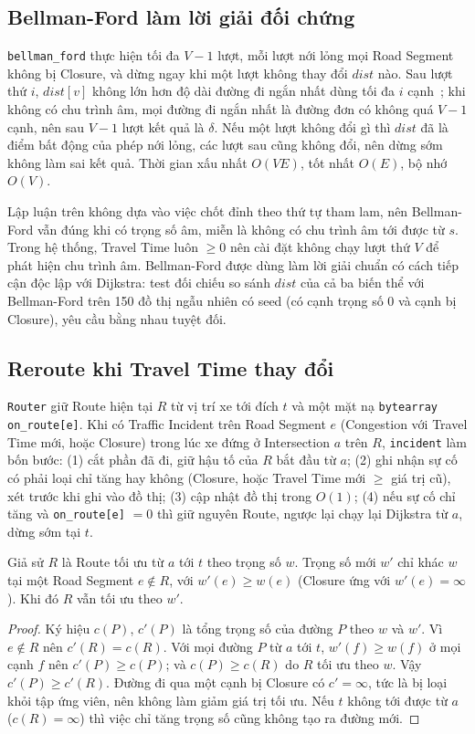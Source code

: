 \subsection{Bellman-Ford làm lời giải đối chứng}

\texttt{bellman\_ford} thực hiện tối đa $V-1$ lượt, mỗi lượt nới lỏng mọi Road Segment không bị Closure, và dừng ngay khi một lượt không thay đổi $\mathit{dist}$ nào. Sau lượt thứ $i$, $\mathit{dist}[v]$ không lớn hơn độ dài đường đi ngắn nhất dùng tối đa $i$ cạnh~\cite{clrs2022}; khi không có chu trình âm, mọi đường đi ngắn nhất là đường đơn có không quá $V-1$ cạnh, nên sau $V-1$ lượt kết quả là $\delta$. Nếu một lượt không đổi gì thì $\mathit{dist}$ đã là điểm bất động của phép nới lỏng, các lượt sau cũng không đổi, nên dừng sớm không làm sai kết quả. Thời gian xấu nhất $O(VE)$, tốt nhất $O(E)$, bộ nhớ $O(V)$.

Lập luận trên không dựa vào việc chốt đỉnh theo thứ tự tham lam, nên Bellman-Ford vẫn đúng khi có trọng số âm, miễn là không có chu trình âm tới được từ $s$. Trong hệ thống, Travel Time luôn $\ge 0$ nên cài đặt không chạy lượt thứ $V$ để phát hiện chu trình âm. Bellman-Ford được dùng làm lời giải chuẩn có cách tiếp cận độc lập với Dijkstra: test đối chiếu so sánh $\mathit{dist}$ của cả ba biến thể với Bellman-Ford trên 150 đồ thị ngẫu nhiên có seed (có cạnh trọng số 0 và cạnh bị Closure), yêu cầu bằng nhau tuyệt đối.

\subsection{Reroute khi Travel Time thay đổi}

\texttt{Router} giữ Route hiện tại $R$ từ vị trí xe tới đích $t$ và một mặt nạ \texttt{bytearray} \texttt{on\_route[e]}. Khi có Traffic Incident trên Road Segment $e$ (Congestion với Travel Time mới, hoặc Closure) trong lúc xe đứng ở Intersection $a$ trên $R$, \texttt{incident} làm bốn bước: (1) cắt phần đã đi, giữ hậu tố của $R$ bắt đầu từ $a$; (2) ghi nhận sự cố có phải loại chỉ tăng hay không (Closure, hoặc Travel Time mới $\ge$ giá trị cũ), xét trước khi ghi vào đồ thị; (3) cập nhật đồ thị trong $O(1)$; (4) nếu sự cố chỉ tăng và \texttt{on\_route[e]} $= 0$ thì giữ nguyên Route, ngược lại chạy lại Dijkstra từ $a$, dừng sớm tại $t$.

\begin{lemma}\label{lem:skip}
Giả sử $R$ là Route tối ưu từ $a$ tới $t$ theo trọng số $w$. Trọng số mới $w'$ chỉ khác $w$ tại một Road Segment $e \notin R$, với $w'(e) \ge w(e)$ (Closure ứng với $w'(e) = \infty$). Khi đó $R$ vẫn tối ưu theo $w'$.
\end{lemma}
\begin{proof}
Ký hiệu $c(P)$, $c'(P)$ là tổng trọng số của đường $P$ theo $w$ và $w'$. Vì $e \notin R$ nên $c'(R) = c(R)$. Với mọi đường $P$ từ $a$ tới $t$, $w'(f) \ge w(f)$ ở mọi cạnh $f$ nên $c'(P) \ge c(P)$; và $c(P) \ge c(R)$ do $R$ tối ưu theo $w$. Vậy $c'(P) \ge c'(R)$. Đường đi qua một cạnh bị Closure có $c' = \infty$, tức là bị loại khỏi tập ứng viên, nên không làm giảm giá trị tối ưu. Nếu $t$ không tới được từ $a$ ($c(R) = \infty$) thì việc chỉ tăng trọng số cũng không tạo ra đường mới.
\end{proof}

